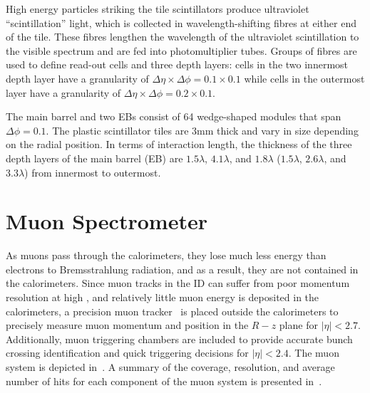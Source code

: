 

High energy particles striking the tile scintillators produce ultraviolet ``scintillation'' light, which is collected in wavelength-shifting fibres at either end of the tile. These fibres lengthen the wavelength of the ultraviolet scintillation to the visible spectrum and are fed into photomultiplier tubes. Groups of fibres are used to define read-out cells and three depth layers: cells in the two innermost depth layer have a granularity of $\Delta\eta\times\Delta\phi=0.1\times0.1$ while cells in the outermost layer have a granularity of $\Delta\eta\times\Delta\phi=0.2\times0.1$.

The main barrel and two EBs consist of 64 wedge-shaped modules that span $\Delta\phi=0.1$.  The plastic scintillator tiles are 3mm thick and vary in size depending on the radial position. In terms of interaction length, the thickness of the three depth layers of the main barrel (EB) are $1.5\lambda$, $4.1\lambda$, and $1.8\lambda$ ($1.5\lambda$, $2.6\lambda$, and $3.3\lambda$) from innermost to outermost. 

\section{Muon Spectrometer}
As muons pass through the calorimeters, they lose much less energy than electrons to Bremsstrahlung radiation,
and as a result, they are not contained in the calorimeters.
Since muon tracks in the ID can suffer from poor momentum resolution at high \pt,
and relatively little muon energy is deposited in the calorimeters, a precision muon tracker~\cite{Muon_TDR} is placed outside the calorimeters to precisely measure muon momentum and position in the $R-z$ plane for $|\eta|<2.7$.  Additionally, muon triggering chambers are included to provide accurate bunch crossing identification and quick triggering decisions for $|\eta|<2.4$. The muon system is depicted in~\Fig{\ref{fig:mu_layout}}.  A summary of the coverage, resolution, and average number of hits for each component of the muon system is presented in~\Tab{\ref{tab:muon_cov}}.

